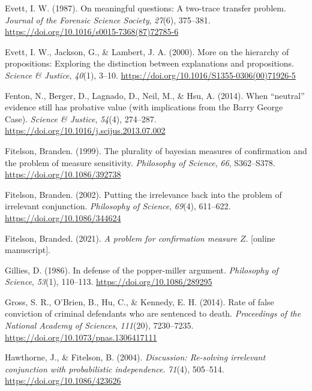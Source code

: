 \documentclass[
  letterpaper,
  DIV=11,
  numbers=noendperiod]{scrartcl}
\newlength{\cslhangindent}
\newlength{\cslentryspacingunit} %
\newenvironment{CSLReferences}[2] %
 {%
  \setlength{\parindent}{0pt}
  \ifodd #1
  \let\oldpar\par
  \def\par{\hangindent=\cslhangindent\oldpar}
  \fi
  \setlength{\parskip}{#2\cslentryspacingunit}
 }%
 {}
\begin{document}
\begin{CSLReferences}{1}{0}
\leavevmode{}%
Evett, I. W. (1987). On meaningful questions: A two-trace transfer
problem. \emph{Journal of the Forensic Science Society}, \emph{27}(6),
375--381. \url{https://doi.org/10.1016/s0015-7368(87)72785-6}

\leavevmode{}%
Evett, I. W., Jackson, G., \& Lambert, J. A. (2000). More on the
hierarchy of propositions: Exploring the distinction between
explanations and propositions. \emph{Science \& Justice}, \emph{40}(1),
3--10. \url{https://doi.org/10.1016/S1355-0306(00)71926-5}

\leavevmode{}%
Fenton, N., Berger, D., Lagnado, D., Neil, M., \& Hsu, A. (2014). When
{``neutral''} evidence still has probative value (with implications from
the {Barry George Case}). \emph{Science \& Justice}, \emph{54}(4),
274--287. \url{https://doi.org/10.1016/j.scijus.2013.07.002}

\leavevmode{}%
Fitelson, Branden. (1999). The plurality of bayesian measures of
confirmation and the problem of measure sensitivity. \emph{Philosophy of
Science}, \emph{66}, S362--S378. \url{https://doi.org/10.1086/392738}

\leavevmode{}%
Fitelson, Branden. (2002). Putting the irrelevance back into the problem
of irrelevant conjunction. \emph{Philosophy of Science}, \emph{69}(4),
611--622. \url{https://doi.org/10.1086/344624}

\leavevmode{}%
Fitelson, Branded. (2021). \emph{A problem for confirmation measure
\(Z\)}. {[}online manuscript{]}.

\leavevmode{}%
Gillies, D. (1986). In defense of the popper-miller argument.
\emph{Philosophy of Science}, \emph{53}(1), 110--113.
\url{https://doi.org/10.1086/289295}

\leavevmode{}%
Gross, S. R., O'Brien, B., Hu, C., \& Kennedy, E. H. (2014). Rate of
false conviction of criminal defendants who are sentenced to death.
\emph{Proceedings of the National Academy of Sciences}, \emph{111}(20),
7230--7235. \url{https://doi.org/10.1073/pnas.1306417111}

\leavevmode{}%
Hawthorne, J., \& Fitelson, B. (2004). \emph{Discussion: Re-solving
irrelevant conjunction with probabilistic independence}. \emph{71}(4),
505--514. \url{https://doi.org/10.1086/423626}


\end{CSLReferences}
\end{document}
